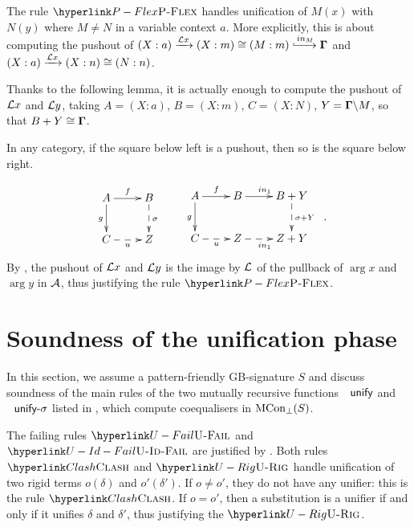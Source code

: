 \label{subsec:pruning-metavar}

The rule $\refrule{P-Flex}$ handles unification of $M(x)$ with $N(y)$
where $M\neq N$ in a variable context $a$. More explicitly, this
is about computing the pushout of $(X:a)\xrightarrow{{\cal L}x}(X:m)\cong(M:m)\xhookrightarrow{in_{M}}\dotmcontext{\Gamma}$
and $(X:a)\xrightarrow{{\cal L}x}(X:n)\cong(N:n)$.

Thanks to the following lemma, it is actually enough to compute the
pushout of ${\cal L}\arg x$ and ${\cal L}\arg y$, taking $A=(X:a)$,
$B=(X:m)$, $C=(X:N)$, $Y=\dotmcontext{\Gamma}\backslash M$, so
that $B+Y\cong\dotmcontext{\Gamma}$.
\begin{lemma}

In any category,  if the square below left is a pushout, then so
is the square below right.

\vspace{-1.5em}
\[
\begin{array}{c}
\xymatrix{A\ar[r]^{f}\ar[d]_{g} & B\ar@{-->}[d]^{\sigma}\\
C\ar@{-->}[r]_{u} & Z
}
\end{array}\quad\begin{array}{c}
\xymatrix{A\ar[r]^{f}\ar[d]_{g} & B\ar[r]^{in_{1}} & B+Y\ar@{-->}[d]^{\sigma+Y}\\
C\ar@{-->}[r]_{u} & Z\ar@{-->}[r]_{in_{1}} & Z+Y
}
\end{array}.
\]
By , the pushout of ${\cal L}\arg x$
and ${\cal L}\arg y$ is the image by ${\cal L}$ of the pullback
of $\arg x$ and $\arg y$ in ${\cal A}$, thus justifying the rule
$\refrule{P-Flex}$.
\end{lemma}

\section{Soundness of the unification phase}

\label{sec:coequalising-phase}

In this section, we assume a pattern-friendly GB-signature $S$ and
discuss soundness of the main rules of the two mutually recursive
functions $\AgdaFunction{unify}$ and $\AgdaFunction{unify-\ensuremath{\sigma}}$
listed in , which compute coequalisers in $\Thbot S$. 

The failing rules $\refrule{U-Fail}$ and $\refrule{U-Id-Fail}$ are
justified by . Both rules $\refrule{Clash}$ and
$\refrule{U-Rig}$ handle unification of two rigid terms $o(\delta)$
and $o'(\delta')$. If $o\neq o'$, they do not have any unifier:
this is the rule $\refrule{Clash}$. If $o=o'$, then a substitution
is a unifier if and only if it unifies $\delta$ and $\delta'$, thus
justifying the $\refrule{U-Rig}$.

